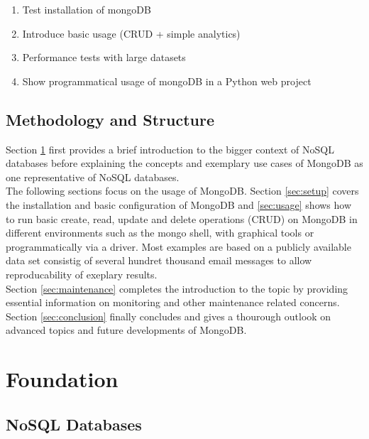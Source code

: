 \begin{enumerate}
  \item Test installation of mongoDB
  \item Introduce basic usage (CRUD + simple analytics)
  \item Performance tests with large datasets
  \item Show programmatical usage of mongoDB in a Python web project
\end{enumerate}

\subsection{Methodology and Structure}
\label{sec:methodology}

Section \ref{sec:foundation} first provides a brief introduction to the bigger
context of NoSQL databases before explaining the concepts and exemplary use
cases of MongoDB as one representative of NoSQL databases.\\
The following sections focus on the usage of MongoDB. Section \ref{sec:setup}
covers the installation and basic configuration of MongoDB and
\autoref{sec:usage} shows how to run basic create, read, update and delete
operations (CRUD) on MongoDB in different environments such as the mongo shell,
with graphical tools or programmatically via a driver.
Most examples are based on a publicly available data set consistig of several
hundret thousand email messages to allow reproducability of exeplary
results.\\
Section \ref{sec:maintenance} completes the introduction to the topic by
providing essential information on monitoring and other maintenance related
concerns. Section \ref{sec:conclusion} finally concludes and gives a thourough
outlook on advanced topics and future developments of MongoDB.


\newpage

\section{Foundation}
\label{sec:foundation}



\subsection{NoSQL Databases}
\label{sec:nosql}

